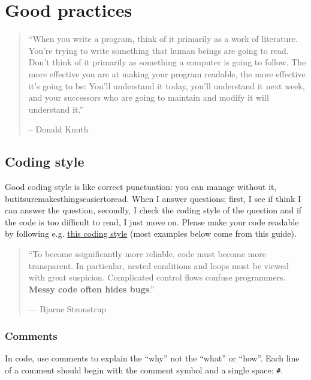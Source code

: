 \documentclass[]{book}
\theoremstyle{definition}
\theoremstyle{definition}
\theoremstyle{definition}
\theoremstyle{remark}
\begin{document}
\hypertarget{good-practices}{%
\chapter{Good practices}\label{good-practices}}

\begin{quote}
``When you write a program, think of it primarily as a work of
literature. You're trying to write something that human beings are going
to read. Don't think of it primarily as something a computer is going to
follow. The more effective you are at making your program readable, the
more effective it's going to be: You'll understand it today, you'll
understand it next week, and your successors who are going to maintain
and modify it will understand it.''

-- Donald Knuth
\end{quote}

\hypertarget{coding-style}{%
\section{Coding style}\label{coding-style}}

Good coding style is like correct punctuation: you can manage without
it, butitsuremakesthingseasiertoread. When I answer questions; first, I
see if think I can answer the question, secondly, I check the coding
style of the question and if the code is too difficult to read, I just
move on. Please make your code readable by following e.g.
\href{http://style.tidyverse.org/}{this coding style} (most examples
below come from this guide).

\begin{quote}
``To become ssignificantly more reliable, code must become more
transparent. In particular, nested conditions and loops must be viewed
with great suspicion. Complicated control flows confuse programmers.
\textbf{Messy code often hides bugs}.''

--- Bjarne Stroustrup
\end{quote}

\hypertarget{comments}{%
\subsection{Comments}\label{comments}}

In code, use comments to explain the ``why'' not the ``what'' or
``how''. Each line of a comment should begin with the comment symbol and
a single space: \texttt{\#}.
\end{document}

